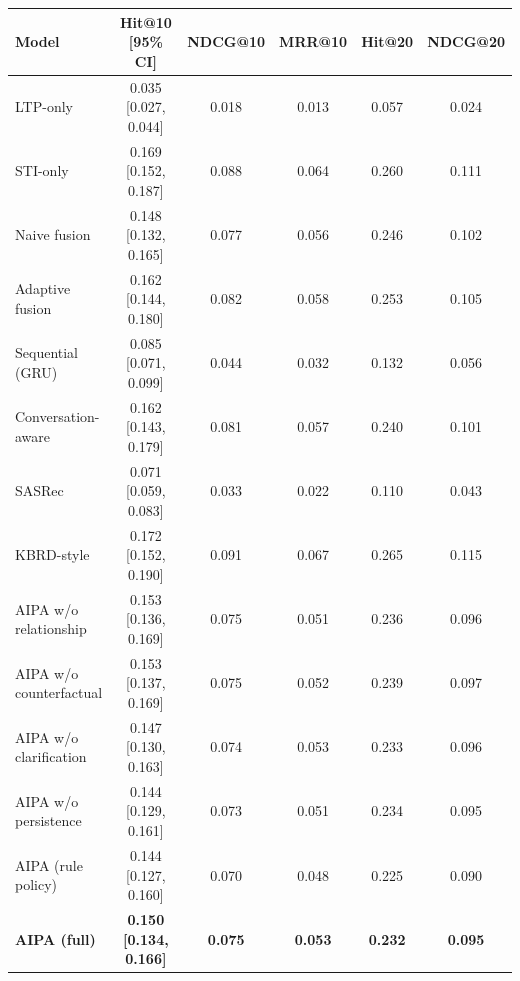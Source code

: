 \begin{tabular}{lccccc}
\toprule
Model & Hit@10 [95\% CI] & NDCG@10 & MRR@10 & Hit@20 & NDCG@20 \\
\midrule
LTP-only & 0.035 [0.027, 0.044] & 0.018 & 0.013 & 0.057 & 0.024 \\
STI-only & 0.169 [0.152, 0.187] & 0.088 & 0.064 & 0.260 & 0.111 \\
Naive fusion & 0.148 [0.132, 0.165] & 0.077 & 0.056 & 0.246 & 0.102 \\
Adaptive fusion & 0.162 [0.144, 0.180] & 0.082 & 0.058 & 0.253 & 0.105 \\
Sequential (GRU) & 0.085 [0.071, 0.099] & 0.044 & 0.032 & 0.132 & 0.056 \\
Conversation-aware & 0.162 [0.143, 0.179] & 0.081 & 0.057 & 0.240 & 0.101 \\
SASRec & 0.071 [0.059, 0.083] & 0.033 & 0.022 & 0.110 & 0.043 \\
KBRD-style & 0.172 [0.152, 0.190] & 0.091 & 0.067 & 0.265 & 0.115 \\
\midrule
AIPA w/o relationship & 0.153 [0.136, 0.169] & 0.075 & 0.051 & 0.236 & 0.096 \\
AIPA w/o counterfactual & 0.153 [0.137, 0.169] & 0.075 & 0.052 & 0.239 & 0.097 \\
AIPA w/o clarification & 0.147 [0.130, 0.163] & 0.074 & 0.053 & 0.233 & 0.096 \\
AIPA w/o persistence & 0.144 [0.129, 0.161] & 0.073 & 0.051 & 0.234 & 0.095 \\
AIPA (rule policy) & 0.144 [0.127, 0.160] & 0.070 & 0.048 & 0.225 & 0.090 \\
\textbf{AIPA (full)} & \textbf{0.150 [0.134, 0.166]} & \textbf{0.075} & \textbf{0.053} & \textbf{0.232} & \textbf{0.095} \\
\bottomrule
\end{tabular}
